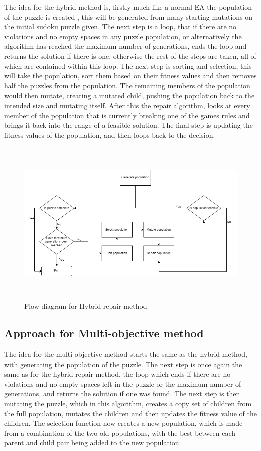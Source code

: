 \documentclass[a4paper,11pt]{article}
\begin{document}
The idea for the hybrid method is, firstly much like a normal EA the population of the puzzle is created , this will be generated from many starting mutations on the initial sudoku puzzle given. The next step is a loop, that if there are no violations and no empty spaces in any puzzle population, or alternatively the algorithm has reached the maximum number of generations, ends the loop and returns the solution if there is one, otherwise the rest of the steps are taken, all of which are contained within this loop. The next step is sorting and selection, this will take the population, sort them based on their fitness values and then removes half the puzzles from the population. The remaining members of the population would then mutate, creating a mutated child, pushing the population back to the intended size and mutating itself. After this the repair algorithm, looks at every member of the population that is currently breaking one of the games rules and brings it back into the range of a feasible solution. The final step is updating the fitness values of the population, and then loops back to the decision.
\begin{figure}[h]
	\caption{Flow diagram for Hybrid repair method}
	\centering
	\includegraphics[height=8cm, width=15cm]{./Diagrams/hybridRepairFlowchart}
\end{figure}
\subsection{Approach for Multi-objective method}
The idea for the multi-objective method starts the same as the hybrid method, with generating the population of the puzzle. The next step is once again the same as for the hybrid repair method, the loop which ends if there are no violations and no empty spaces left in the puzzle or the maximum number of generations, and returns the solution if one was found. The next step is then mutating the puzzle, which in this algorithm, creates a copy set of children from the full population, mutates the children and then updates the fitness value of the children. The selection function now creates a new population, which is made from a combination of the two old populations, with the best between each parent and child pair being added to the new population.  
\end{document}
